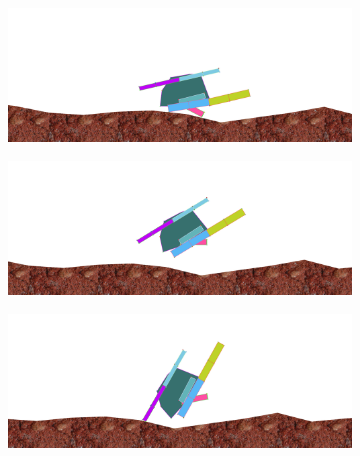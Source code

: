        \begin{figure}[H]
          \centering
          \begin{subfigure}[b]{0.45\textwidth}
            \includegraphics[width=\linewidth,center]{graphics/simulation-results/4_gen3000_1}
            \caption{\label{fig:gen3000_1}}
          \end{subfigure}
          \begin{subfigure}[b]{0.45\textwidth}
            \includegraphics[width=\linewidth,center]{graphics/simulation-results/4_gen3000_2}
            \caption{\label{fig:gen3000_2}}
          \end{subfigure}
          \begin{subfigure}[b]{0.45\textwidth}
            \includegraphics[width=\linewidth,center]{graphics/simulation-results/4_gen3000_3}
            \caption{\label{fig:gen3000_3}}
          \end{subfigure}
          \begin{subfigure}[b]{0.45\textwidth}

\end{subfigure}
\end{figure}
